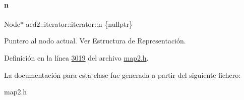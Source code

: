 \paragraph{\texorpdfstring{n}{n}}
{\footnotesize\ttfamily Node$\ast$ aed2\+::iterator\+::iterator\+::n \{nullptr\}\hspace{0.3cm}{\ttfamily [private]}}



Puntero al nodo actual. Ver Estructura de Representación. 



Definición en la línea \hyperlink{map2_8h_source_l03019}{3019} del archivo \hyperlink{map2_8h_source}{map2.\+h}.



La documentación para esta clase fue generada a partir del siguiente fichero\+:\begin{DoxyCompactItemize}
\item 
map2.\+h\end{DoxyCompactItemize}
